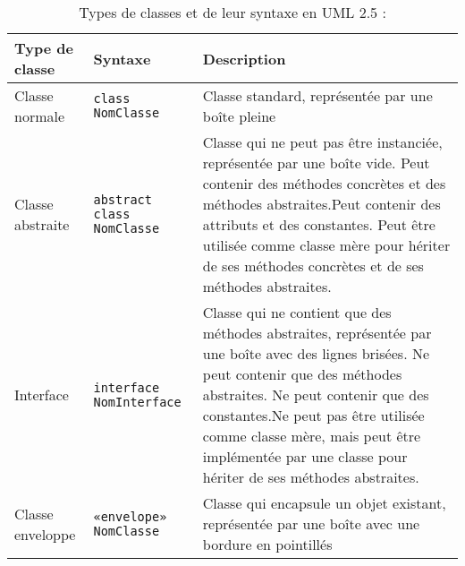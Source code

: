 \begin{table}[H]
\caption{Types de classes et de leur syntaxe en UML 2.5 :}
\label{tbl:diagram_class_classetypes}
\begin{adjustbox}{max width=\textwidth}
\begin{tabular}{p{4cm}|p{4cm}|p{8cm}}
\toprule
\textbf{Type de classe} & \textbf{Syntaxe} & \textbf{Description} \\
\midrule
Classe normale & \texttt{class NomClasse} & Classe standard, représentée par une boîte pleine \\
\midrule
Classe abstraite & \texttt{abstract class NomClasse} & Classe qui ne peut pas être instanciée, représentée par une boîte vide.
Peut contenir des méthodes concrètes et des méthodes abstraites.Peut contenir des attributs et des constantes. Peut être utilisée comme classe mère pour hériter de ses méthodes concrètes et de ses méthodes abstraites. \\
\midrule
Interface & \texttt{interface NomInterface} & Classe qui ne contient que des méthodes abstraites, représentée par une boîte avec des lignes brisées. Ne peut contenir que des méthodes abstraites. Ne peut contenir que des constantes.Ne peut pas être utilisée comme classe mère, mais peut être implémentée par une classe pour hériter de ses méthodes abstraites. \\
\midrule
Classe enveloppe & \texttt{«envelope» NomClasse} & Classe qui encapsule un objet existant, représentée par une boîte avec une bordure en pointillés \\
\bottomrule
\end{tabular}
\end{adjustbox}
\end{table}
